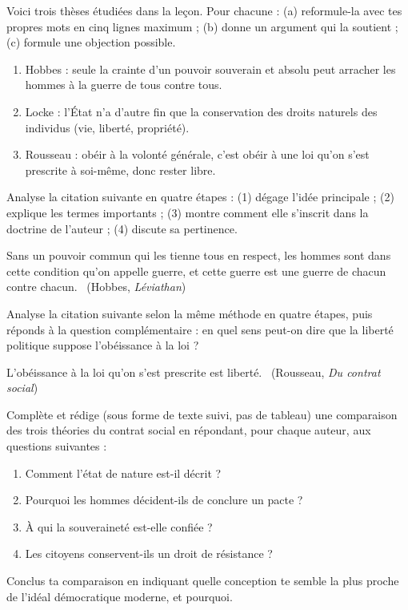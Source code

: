 \documentclass[11pt]{article}
\newcounter{popsec}
\newcounter{popsub}
\newcommand{\courssub}[1]{%
  \stepcounter{popsub}%
  \par\vspace{9pt}\noindent{\popxbold\fontsize{11.5}{13}\selectfont\color{popink}{\color{poporange}\thepopsec.\thepopsub}\hspace{6pt}#1}\par\nopagebreak\vspace{4pt}
}
\begin{document}
\courssub{Je m'entraîne}

\begin{exercice}
Voici trois thèses étudiées dans la leçon. Pour chacune : (a) reformule-la avec tes propres mots en cinq lignes maximum ; (b) donne un argument qui la soutient ; (c) formule une objection possible.

\begin{enumerate}
\item Hobbes : seule la crainte d'un pouvoir souverain et absolu peut arracher les hommes à la guerre de tous contre tous.
\item Locke : l'État n'a d'autre fin que la conservation des droits naturels des individus (vie, liberté, propriété).
\item Rousseau : obéir à la volonté générale, c'est obéir à une loi qu'on s'est prescrite à soi-même, donc rester libre.
\end{enumerate}
\end{exercice}

\begin{exercice}
Analyse la citation suivante en quatre étapes : (1) dégage l'idée principale ; (2) explique les termes importants ; (3) montre comment elle s'inscrit dans la doctrine de l'auteur ; (4) discute sa pertinence.

\guillemotleft Sans un pouvoir commun qui les tienne tous en respect, les hommes sont dans cette condition qu'on appelle guerre, et cette guerre est une guerre de chacun contre chacun. \guillemotright\ (Hobbes, \emph{Léviathan})
\end{exercice}

\begin{exercice}
Analyse la citation suivante selon la même méthode en quatre étapes, puis réponds à la question complémentaire : en quel sens peut-on dire que la liberté politique suppose l'obéissance à la loi ?

\guillemotleft L'obéissance à la loi qu'on s'est prescrite est liberté. \guillemotright\ (Rousseau, \emph{Du contrat social})
\end{exercice}

\begin{exercice}
Complète et rédige (sous forme de texte suivi, pas de tableau) une comparaison des trois théories du contrat social en répondant, pour chaque auteur, aux questions suivantes :
\begin{enumerate}
\item Comment l'état de nature est-il décrit ?
\item Pourquoi les hommes décident-ils de conclure un pacte ?
\item À qui la souveraineté est-elle confiée ?
\item Les citoyens conservent-ils un droit de résistance ?
\end{enumerate}
Conclus ta comparaison en indiquant quelle conception te semble la plus proche de l'idéal démocratique moderne, et pourquoi.
\end{exercice}
\end{document}
